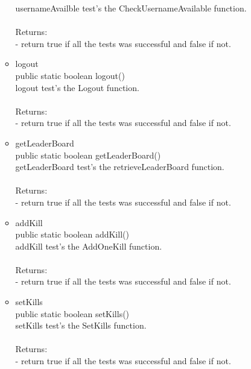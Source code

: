 \documentclass[letterpaper]{article}
\begin{document}
\begin{itemize}
\begin{itemize}
													usernameAvailble test's the CheckUsernameAvailable function. \\ \\
													Returns: \\
													- return true if all the tests was successful and false if not.
													
													\item	logout \\
													 public static boolean logout() \\
		
													logout test's the Logout function. \\ \\
													Returns: \\
													- return true if all the tests was successful and false if not.
													
													\item	getLeaderBoard \\
													public static boolean getLeaderBoard() \\
		
													getLeaderBoard test's the retrieveLeaderBoard function. \\ \\
													Returns: \\
													- return true if all the tests was successful and false if not.
													
													\item	addKill \\
													 public static boolean addKill() \\
		
													addKill test's the AddOneKill function. \\ \\
													Returns: \\
													- return true if all the tests was successful and false if not.
													
													\item	setKills \\
													  public static boolean setKills() \\
		
													setKills test's the SetKills function. \\ \\
													Returns: \\
													- return true if all the tests was successful and false if not.
													

\end{itemize}
\end{itemize}
\end{document}
